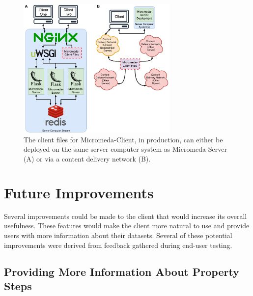 \begin{figure}[!ht]
  \centering
	\includegraphics[width=0.7\textwidth]{media/micromeda-client-deployment.pdf}
	 \caption{The client files for Micromeda-Client, in production, can either be deployed on the same server computer system as Micromeda-Server (A) or via a content delivery network (B).}
	 \label{fig:client-deployment}
\end{figure}

\section{Future Improvements} \label{client-improvements}

Several improvements could be made to the client that would increase its overall usefulness. These features would make the client more natural to use and provide users with more information about their datasets. Several of these potential improvements were derived from feedback gathered during end-user testing.

\subsection{Providing More Information About Property Steps}

